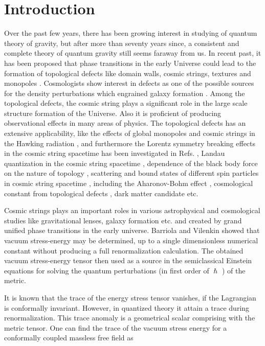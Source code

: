 \documentclass[preprint,superscriptaddress,amsfonts,amssymb,amsmath,showpacs]{revtex4}
\begin{document}
\section{Introduction}
Over the past few years, there has been growing interest in studying of quantum theory of gravity, but after more than seventy years since, a consistent and complete theory of quantum gravity still seems faraway from us. In recent past, it has been proposed that  phase transitions in the early Universe could lead to the formation of topological defects like domain walls, cosmic strings, textures and monopoles \cite{kibble,vilenkin1,Rahaman2,got,mello}. Cosmologists show  interest in defects as one of the possible sources for the density perturbations which engrained galaxy formation \cite{kunz}. Among the topological defects, the cosmic string plays a significant role  in the large scale structure formation of the Universe. Also  it is proficient of producing observational effects in many areas of physics.
The topological defects has an extensive applicability, like the effects of global monopoles and cosmic strings in the Hawking radiation  \cite{vieira1,vieira2,kimet0}, and furthermore the Lorentz symmetry breaking effects in the cosmic string spacetime has been investigated in Refs. \cite{belich1,bakke1,kimet4}, Landau quantization in the cosmic string spacetime \cite{cunha1}, dependence of the black body force on the nature of topology \cite{cunha2}, scattering and bound states of different spin particles in cosmic string spacetime \cite{andreade1,andreade2}, including the Aharonov-Bohm effect \cite{andreade3}, cosmological constant from  topological defects \cite{R4}, dark matter candidate \cite{R5} etc. 

Cosmic strings plays an important roles in various astrophysical and cosmological studies like gravitational lenses, galaxy formation etc. and created by grand unified phase transitions in the early universe. Barriola and Vilenkin \cite{vilenkin3} showed that vacuum stress-energy may be determined, up to a single dimensionless numerical constant without producing a full renormalization calculation. The obtained vacuum stress-energy tensor then used as a source in the semiclassical Einstein equations for solving the quantum perturbations (in first order of $\hslash$ ) of the metric.

It is known  that  the trace of the energy  stress tensor vanishes,  if the Lagrangian is conformally invariant.  However, in quantized theory it attain a trace  during renormalization. This trace anomaly is a geometrical scalar  comprising with  the metric tensor. 
One can find the trace of the vacuum stress energy for a 
conformally coupled massless free field  as \cite{Hiscock1,Hiscock2,Linet,Rahaman1}
\end{document}
